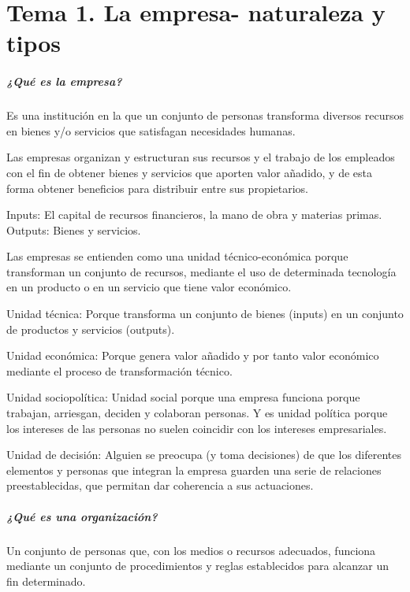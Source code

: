 \documentclass[12pt, twoside, openright]{report} %
\begin{document}






\chapter{Tema 1. La empresa- naturaleza y tipos}

\paragraph{¿Qué es la empresa?}
Es una institución en la que un conjunto de personas transforma diversos recursos en
bienes y/o servicios que satisfagan necesidades humanas.

Las empresas organizan y estructuran sus recursos y el trabajo de los empleados con el fin de obtener bienes
y servicios que aporten valor añadido, y de esta forma obtener beneficios para distribuir entre sus
propietarios.

Inputs: El capital de recursos financieros, la mano de obra y materias primas. Outputs: Bienes y servicios.

Las empresas se entienden como una unidad técnico-económica porque transforman un conjunto de
recursos, mediante el uso de determinada tecnología en un producto o en un servicio que tiene valor
económico.

Unidad técnica: Porque transforma un conjunto de bienes (inputs) en un conjunto de productos y servicios
(outputs).

Unidad económica: Porque genera valor añadido y por tanto valor económico mediante el proceso de
transformación técnico.

Unidad sociopolítica: Unidad social porque una empresa funciona porque trabajan, arriesgan, deciden y
colaboran personas. Y es unidad política porque los intereses de las personas no suelen coincidir con los
intereses empresariales.

Unidad de decisión: Alguien se preocupa (y toma decisiones) de que los diferentes elementos y personas
que integran la empresa guarden una serie de relaciones preestablecidas, que permitan dar coherencia a sus
actuaciones.

\paragraph{¿Qué es una organización?}
Un conjunto de personas que, con los medios o recursos adecuados, funciona
mediante un conjunto de procedimientos y reglas establecidos para alcanzar un fin determinado.
\end{document}
